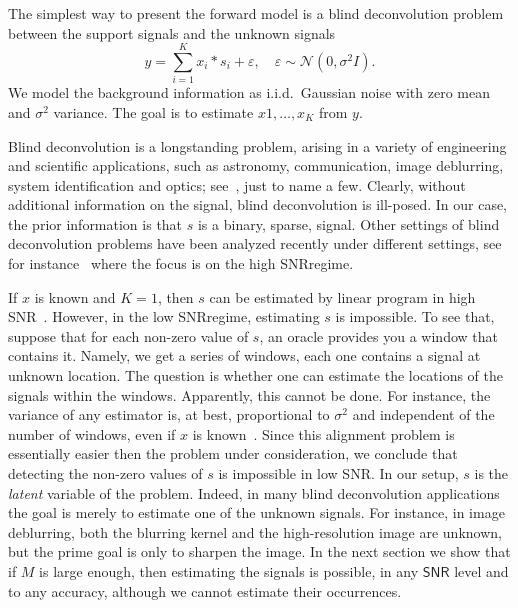 \documentclass[english]{article}
\numberwithin{equation}{section}
\theoremstyle{plain}
\theoremstyle{definition}
\theoremstyle{remark}
\theoremstyle{plain}
\theoremstyle{remark}
\theoremstyle{plain}
\theoremstyle{plain}
\newcommand{\SNR}{{\textsf{SNR}}}
\begin{document}
The simplest way to present the forward model is a blind deconvolution problem between the support signals and the unknown signals
\begin{equation}
y = \sum_{i=1}^K x_i\ast s_i + \varepsilon,\quad \varepsilon\sim\mathcal{N}(0,\sigma^2 I).
\end{equation}
We model the background information as i.i.d.\ Gaussian noise with zero mean and $\sigma^2$ variance. 
The goal is to estimate $x1,\ldots,x_K$ from $y$.

Blind deconvolution is a longstanding problem, arising in a variety of engineering and scientific applications, such as astronomy, communication, image deblurring, system identification and optics; see~\cite{jefferies1993restoration,shalvi1990new,ayers1988iterative,abed1997blind}, just to name a few. Clearly, without additional information on the signal, blind deconvolution is ill-posed. In our case, the prior information is that $s$ is a binary, sparse, signal. 
Other settings of blind deconvolution problems have been analyzed recently under different settings, see for instance~\cite{ahmed2014blind,li2016identifiability,li2016rapid,ling2015self,ling2017blind,chi2016guaranteed}
where the focus is on the high \SNR regime.

If $x$ is known and $K=1$, then  $s$ can be estimated by linear program in high \SNR~\cite{de2012exact,duval2015exact,bendory2016robust,bendory2017robust,bernstein2017deconvolution}. However, in the low \SNR regime, estimating $s$ is impossible. To see that, suppose that for each non-zero value of $s$, an oracle provides you 
a window that contains it. Namely, we get a series of windows, each one contains a signal at unknown location. The question is whether one can estimate the locations of the signals within the windows. Apparently, this cannot be done. For instance, the variance of any estimator is, at best, proportional to $\sigma^2$ and independent of the number of windows, even if $x$ is known~\cite{aguerrebere2016fundamental}.  Since this alignment problem is essentially easier then the problem under consideration, we conclude that detecting the non-zero values of $s$ is impossible in low \SNR. In our setup, $s$ is the \emph{latent} variable of the problem. Indeed, in many blind deconvolution applications the goal is merely to estimate one of the unknown signals. For instance, in image deblurring, both the blurring
kernel and the high-resolution image are unknown, but the prime goal is only
to sharpen the image.
In the next section we show that if $M$ is large enough, then estimating the signals is possible, in any $\SNR$ level and to any accuracy, although we cannot estimate their occurrences. 
\end{document}

